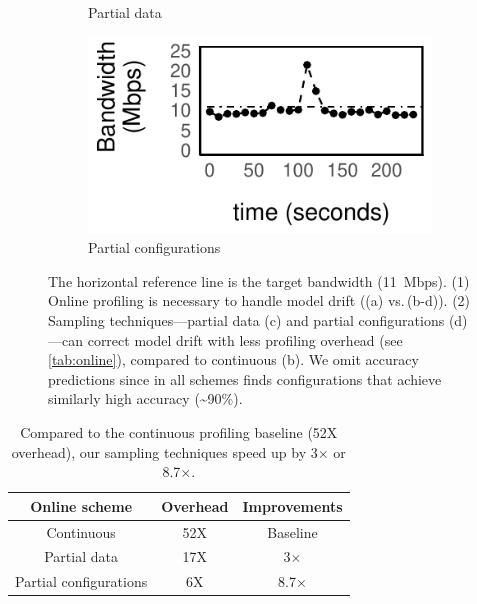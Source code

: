 \begin{figure}
\begin{subfigure}[t]{0.45\columnwidth}
    \caption{Partial data}
    \label{fig:online-partial}
  \end{subfigure}
  \hfill
  \begin{subfigure}[t]{0.45\columnwidth}
    \includegraphics[width=\textwidth]{figures/online4.pdf}
    \caption{Partial configurations}
    \label{fig:online-trigger}
  \end{subfigure}
  \caption{The horizontal reference line is the target bandwidth
    (\SI{11}{Mbps}). (1) Online profiling is necessary to handle model drift
    ((a) vs.\,(b-d)). (2) Sampling techniques---partial data (c) and partial
    configurations (d)---can correct model drift with less profiling overhead
    (see \autoref{tab:online}), compared to continuous (b).  We omit accuracy
    predictions since in all schemes \sysname{} finds configurations that
    achieve similarly high accuracy (\textasciitilde 90\%).  }
  \label{fig:online-tricks}
\end{figure}


\begin{table}[t]
  \footnotesize
  \centering
  \begin{tabular}{c c c}
    \toprule
    Online scheme & Overhead & Improvements \\
    \midrule
    Continuous & 52X & Baseline \\
    Partial data & 17X & 3$\times$\\
    Partial configurations & 6X & 8.7$\times$ \\
    \bottomrule
  \end{tabular}
  \caption{Compared to the continuous profiling baseline (52X overhead), our
    sampling techniques speed up by 3$\times$ or 8.7$\times$.}
  \label{tab:online}
  \vspace{-1em}
\end{table}

